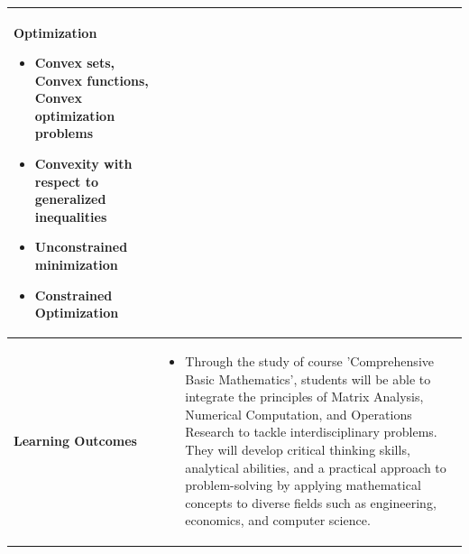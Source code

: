 \documentclass{article}
\begin{document}
\begin{longtable}{|p{3cm}|p{10cm}|}
Optimization
\begin{itemize}
    \item Convex sets, Convex functions, Convex optimization problems
    \item Convexity with respect to generalized inequalities
    \item Unconstrained minimization
    \item Constrained Optimization
\end{itemize}\\
\hline
\textbf{Learning Outcomes} & 
    \begin{itemize}
        \item Through the study of course 'Comprehensive Basic Mathematics', students will be able to integrate the principles of Matrix Analysis, Numerical Computation, and Operations Research to tackle interdisciplinary problems. They will develop critical thinking skills, analytical abilities, and a practical approach to problem-solving by applying mathematical concepts to diverse fields such as engineering, economics, and computer science.
    \end{itemize} \\
\hline
\end{longtable}
\end{document}
